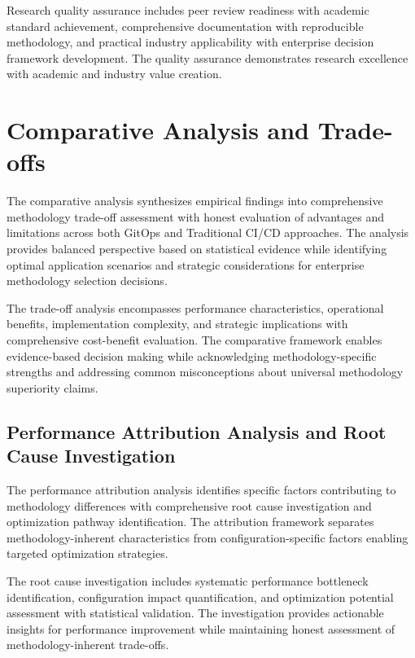 Research quality assurance includes peer review readiness with academic standard achievement, comprehensive documentation with reproducible methodology, and practical industry applicability with enterprise decision framework development. The quality assurance demonstrates research excellence with academic and industry value creation.


\section{Comparative Analysis and Trade-offs}
\label{sec:comparative_analysis}

The comparative analysis synthesizes empirical findings into comprehensive methodology trade-off assessment with honest evaluation of advantages and limitations across both GitOps and Traditional CI/CD approaches. The analysis provides balanced perspective based on statistical evidence while identifying optimal application scenarios and strategic considerations for enterprise methodology selection decisions.

The trade-off analysis encompasses performance characteristics, operational benefits, implementation complexity, and strategic implications with comprehensive cost-benefit evaluation. The comparative framework enables evidence-based decision making while acknowledging methodology-specific strengths and addressing common misconceptions about universal methodology superiority claims.

\subsection{Performance Attribution Analysis and Root Cause Investigation}
\label{subsec:performance_attribution}

The performance attribution analysis identifies specific factors contributing to methodology differences with comprehensive root cause investigation and optimization pathway identification. The attribution framework separates methodology-inherent characteristics from configuration-specific factors enabling targeted optimization strategies.

The root cause investigation includes systematic performance bottleneck identification, configuration impact quantification, and optimization potential assessment with statistical validation. The investigation provides actionable insights for performance improvement while maintaining honest assessment of methodology-inherent trade-offs.

